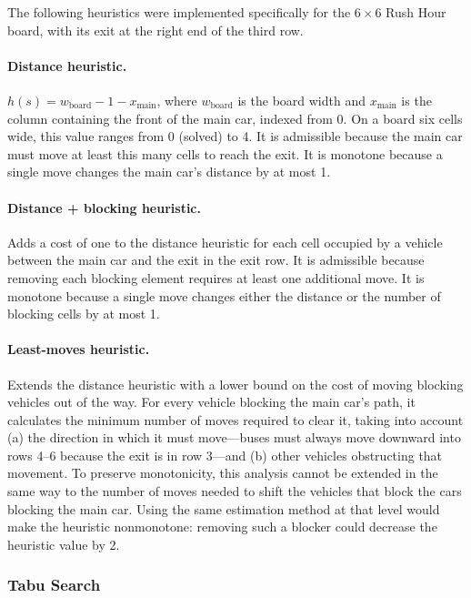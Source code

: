 The following heuristics were implemented specifically for the $6 \times 6$ Rush Hour board, with its exit at the right end of the third row.

\paragraph{Distance heuristic.} $h(s) = w_{\text{board}} - 1 - x_{\text{main}}$, where $w_{\text{board}}$ is the board width and $x_{\text{main}}$ is the column containing the front of the main car, indexed from 0. On a board six cells wide, this value ranges from 0 (solved) to 4. It is admissible because the main car must move at least this many cells to reach the exit. It is monotone because a single move changes the main car's distance by at most 1.

\paragraph{Distance + blocking heuristic.} Adds a cost of one to the distance heuristic for each cell occupied by a vehicle between the main car and the exit in the exit row. It is admissible because removing each blocking element requires at least one additional move. It is monotone because a single move changes either the distance or the number of blocking cells by at most 1.

\paragraph{Least-moves heuristic.} Extends the distance heuristic with a lower bound on the cost of moving blocking vehicles out of the way. For every vehicle blocking the main car's path, it calculates the minimum number of moves required to clear it, taking into account (a) the direction in which it must move---buses must always move downward into rows 4--6 because the exit is in row 3---and (b) other vehicles obstructing that movement. To preserve monotonicity, this analysis cannot be extended in the same way to the number of moves needed to shift the vehicles that block the cars blocking the main car. Using the same estimation method at that level would make the heuristic nonmonotone: removing such a blocker could decrease the heuristic value by 2.

\subsubsection{Tabu Search}
\label{sec:tabu}

